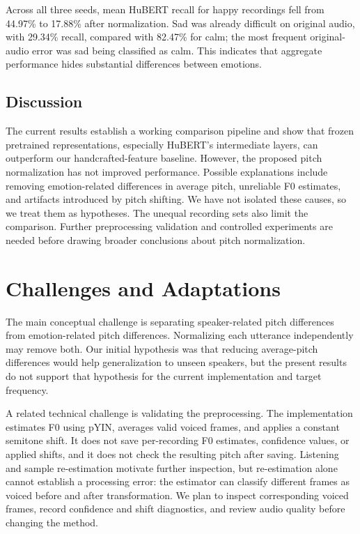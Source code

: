 \documentclass[11pt, letterpaper]{article}
\begin{document}
Across all three seeds, mean HuBERT recall for happy recordings fell from 44.97\% to 17.88\% after normalization. Sad was already difficult on original audio, with 29.34\% recall, compared with 82.47\% for calm; the most frequent original-audio error was sad being classified as calm. This indicates that aggregate performance hides substantial differences between emotions.

\subsection{Discussion}

The current results establish a working comparison pipeline and show that frozen pretrained representations, especially HuBERT's intermediate layers, can outperform our handcrafted-feature baseline. However, the proposed pitch normalization has not improved performance. Possible explanations include removing emotion-related differences in average pitch, unreliable F0 estimates, and artifacts introduced by pitch shifting. We have not isolated these causes, so we treat them as hypotheses. The unequal recording sets also limit the comparison. Further preprocessing validation and controlled experiments are needed before drawing broader conclusions about pitch normalization.

\section{Challenges and Adaptations}

The main conceptual challenge is separating speaker-related pitch differences from emotion-related pitch differences. Normalizing each utterance independently may remove both. Our initial hypothesis was that reducing average-pitch differences would help generalization to unseen speakers, but the present results do not support that hypothesis for the current implementation and target frequency.

A related technical challenge is validating the preprocessing. The implementation estimates F0 using pYIN, averages valid voiced frames, and applies a constant semitone shift. It does not save per-recording F0 estimates, confidence values, or applied shifts, and it does not check the resulting pitch after saving. Listening and sample re-estimation motivate further inspection, but re-estimation alone cannot establish a processing error: the estimator can classify different frames as voiced before and after transformation. We plan to inspect corresponding voiced frames, record confidence and shift diagnostics, and review audio quality before changing the method.
\end{document}
